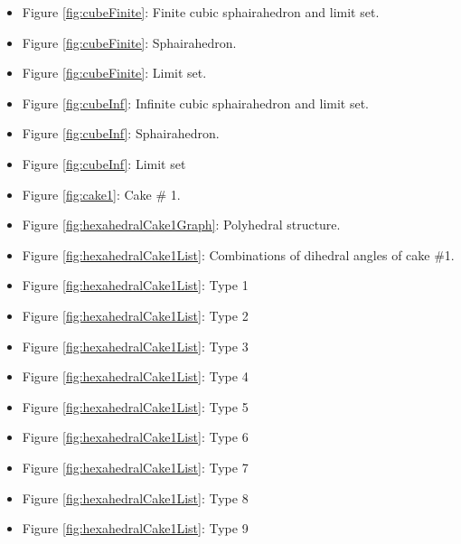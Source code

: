 \documentclass[suppldata, dvipdfmx]{interact}
\theoremstyle{plain}%
\theoremstyle{definition}
\theoremstyle{remark}
\theoremstyle{problemstyle}
\begin{document}
\begin{itemize}
\item Figure \ref{fig:cubeFinite}: Finite cubic sphairahedron and
      limit set. 
\item Figure \ref{fig:cubeFinite}:
      Sphairahedron.
\item Figure \ref{fig:cubeFinite}: Limit set.

\item Figure \ref{fig:cubeInf}: Infinite cubic sphairahedron and
      limit set.
\item Figure \ref{fig:cubeInf}:
      Sphairahedron.
\item Figure \ref{fig:cubeInf}: Limit
      set

\item Figure \ref{fig:cake1}: Cake \# 1.
\item Figure \ref{fig:hexahedralCake1Graph}: Polyhedral structure.

\item Figure \ref{fig:hexahedralCake1List}: Combinations of dihedral angles of cake \#1.
\item Figure \ref{fig:hexahedralCake1List}: Type 1
\item Figure \ref{fig:hexahedralCake1List}: Type 2
\item Figure \ref{fig:hexahedralCake1List}: Type 3
\item Figure \ref{fig:hexahedralCake1List}: Type 4
\item Figure \ref{fig:hexahedralCake1List}: Type 5
\item Figure \ref{fig:hexahedralCake1List}: Type 6
\item Figure \ref{fig:hexahedralCake1List}: Type 7
\item Figure \ref{fig:hexahedralCake1List}: Type 8
\item Figure \ref{fig:hexahedralCake1List}: Type 9


\end{itemize}
\end{document}
